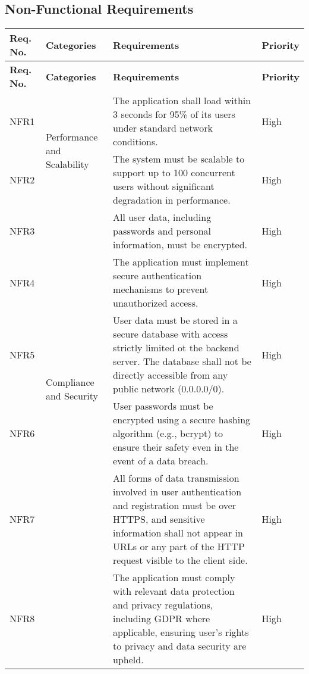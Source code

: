 \subsection{Non-Functional Requirements}
\begin{longtable}{ |m{1.5cm}|m{3.5cm}|m{7cm}|m{1.5cm}| }
    \hline
    \rowcolor{lightgray}
    \textbf{Req. No.} & \textbf{Categories} & \textbf{Requirements} & \textbf{Priority} \\
    \hline
    \endfirsthead

    \hline
    \rowcolor{lightgray}
    \textbf{Req. No.} & \textbf{Categories} & \textbf{Requirements} & \textbf{Priority} \\
    \hline
    \endhead
    NFR1 & \multirow{2}{=}{Performance and Scalability} & The application shall load within 3 seconds for 95\% of its users under standard network conditions. & High \\
    \cline{1-1} \cline{3-4}
    NFR2 &  & The system must be scalable to support up to 100 concurrent users without significant degradation in performance. & High \\
    \hline
    NFR3 & \multirow{5}{=}{Compliance and Security} & All user data, including passwords and personal information, must be encrypted. & High \\
    \cline{1-1} \cline{3-4}
    NFR4 &  & The application must implement secure authentication mechanisms to prevent unauthorized access. & High \\
    \cline{1-1} \cline{3-4}
    NFR5 &  & User data must be stored in a secure database with access strictly limited ot the backend server. The database shall not be directly accessible from any public network (0.0.0.0/0). & High \\
    \cline{1-1} \cline{3-4}
    NFR6 &  & User passwords must be encrypted using a secure hashing algorithm (e.g., bcrypt) to ensure their safety even in the event of a data breach. & High \\
    \cline{1-1} \cline{3-4}
    NFR7 &  & All forms of data transmission involved in user authentication and registration must be over HTTPS, and sensitive information shall not appear in URLs or any part of the HTTP request visible to the client side. & High \\
    \cline{1-1} \cline{3-4}
    NFR8 &  & The application must comply with relevant data protection and privacy regulations, including GDPR where applicable, ensuring user's rights to privacy and data security are upheld. & High \\

\end{longtable}
